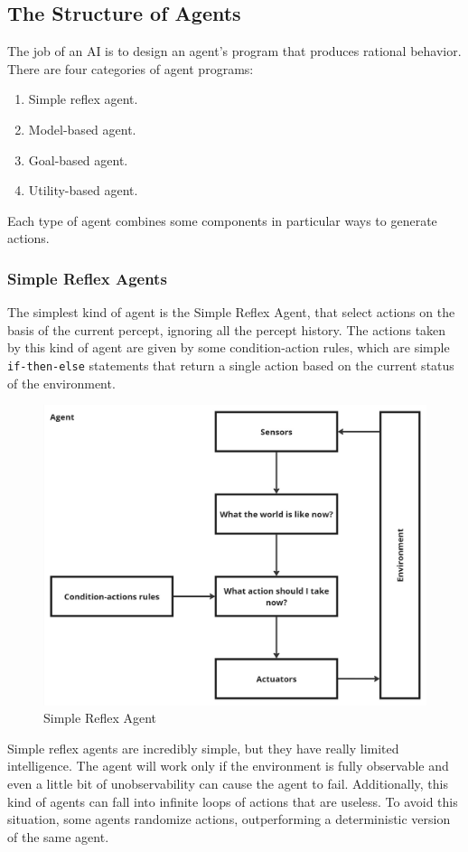 \documentclass{article}
\newcommand{\code}{\lstinline}
\begin{document}
\subsection{The Structure of Agents}
The job of an AI is to design an agent's program that produces rational behavior. There are four categories of agent programs:
\begin{enumerate}
    \item Simple reflex agent.
    \item Model-based agent.
    \item Goal-based agent.
    \item Utility-based agent.
\end{enumerate}

Each type of agent combines some components in particular ways to generate actions.

\subsubsection{Simple Reflex Agents}
The simplest kind of agent is the Simple Reflex Agent, that select actions on the basis of the current percept, ignoring all the percept history. The actions taken by this kind of agent are given by some condition-action rules, which are simple \code{if-then-else} statements that return a single action based on the current status of the environment.

\begin{figure}[h]
    \centering
    \includegraphics[width=0.5\linewidth]{images/Simple Reflex Agent.jpg}
    \caption{Simple Reflex Agent}
    \label{fig:simple_reflex_agent}
\end{figure}

Simple reflex agents are incredibly simple, but they have really limited intelligence. The agent will work only if the environment is fully observable and even a little bit of unobservability can cause the agent to fail. Additionally, this kind of agents can fall into infinite loops of actions that are useless. To avoid this situation, some agents randomize actions, outperforming a deterministic version of the same agent. 
\end{document}
